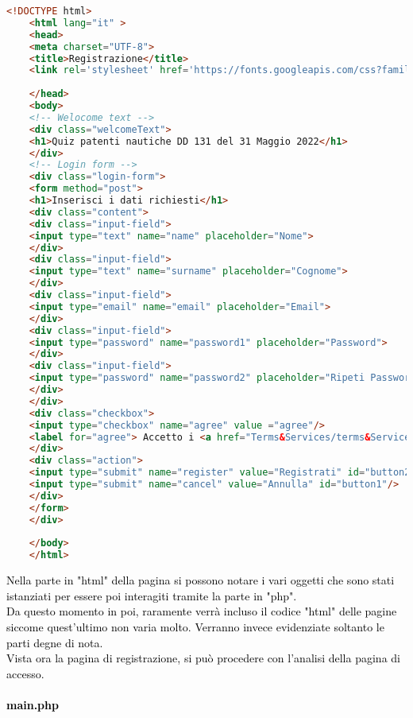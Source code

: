  \begin{lstlisting}[language=html]
 	<!DOCTYPE html>
 	<html lang="it" >
 	<head>
 	<meta charset="UTF-8">
 	<title>Registrazione</title>
 	<link rel='stylesheet' href='https://fonts.googleapis.com/css?family=Rubik:400,700'><link rel="stylesheet" href="style.css">
 	
 	</head>
 	<body>
 	<!-- Welocome text -->
 	<div class="welcomeText">
 	<h1>Quiz patenti nautiche DD 131 del 31 Maggio 2022</h1>
 	</div>
 	<!-- Login form -->
 	<div class="login-form">
 	<form method="post">
 	<h1>Inserisci i dati richiesti</h1>
 	<div class="content">
 	<div class="input-field">
 	<input type="text" name="name" placeholder="Nome">
 	</div>
 	<div class="input-field">
 	<input type="text" name="surname" placeholder="Cognome">
 	</div>
 	<div class="input-field">
 	<input type="email" name="email" placeholder="Email">
 	</div>
 	<div class="input-field">
 	<input type="password" name="password1" placeholder="Password">
 	</div>
 	<div class="input-field">
 	<input type="password" name="password2" placeholder="Ripeti Password">
 	</div>
 	</div>
 	<div class="checkbox">
 	<input type="checkbox" name="agree" value ="agree"/>
 	<label for="agree"> Accetto i <a href="Terms&Services/terms&Services.html">Termini</a> di utilizzo</label>
 	</div>
 	<div class="action">
 	<input type="submit" name="register" value="Registrati" id="button2"/>
 	<input type="submit" name="cancel" value="Annulla" id="button1"/>
 	</div>
 	</form>
 	</div>
 	
 	</body>
 	</html>
  \end{lstlisting}
  
  \textcolor{black}{Nella parte in "html" della pagina si possono notare i vari oggetti che sono stati istanziati per essere poi interagiti tramite la parte in "php".\\
  	 Da questo momento in poi, raramente verrà incluso il codice "html" delle pagine siccome quest'ultimo non varia molto. Verranno invece evidenziate soltanto le parti degne di nota.}\\
  \bigskip
  \textcolor{black}{Vista ora la pagina di registrazione, si può procedere con l'analisi della pagina di accesso.}\\
  
  \paragraph{\textcolor{black}{main.php}}\leavevmode\\
  
